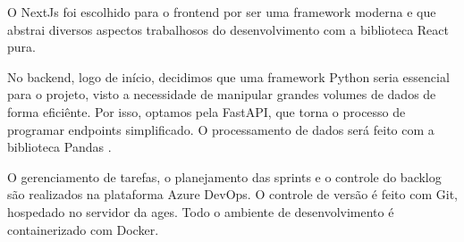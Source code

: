   O NextJs foi escolhido para o frontend por ser uma framework moderna e que abstrai diversos aspectos trabalhosos do desenvolvimento com a biblioteca React pura.

  No backend, logo de início, decidimos que uma framework Python seria essencial para o projeto, visto a necessidade de manipular grandes volumes de dados de forma eficiênte. Por isso, optamos pela FastAPI, que torna o processo de programar endpoints simplificado. O processamento de dados será feito com a biblioteca Pandas \cite{pandas}.

  O gerenciamento de tarefas, o planejamento das sprints e o controle do backlog são realizados na plataforma Azure DevOps. O controle de versão é feito com Git, hospedado no servidor da \acs{ages}. Todo o ambiente de desenvolvimento é containerizado com Docker.